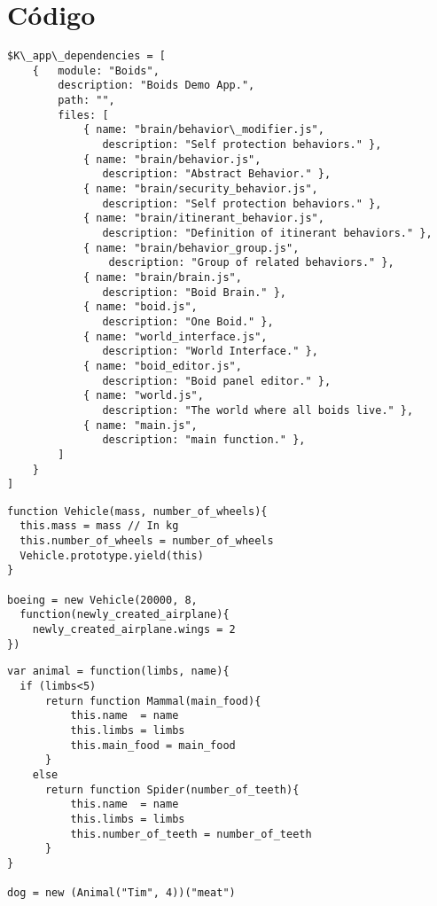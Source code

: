 \section{Código}
\label{sec:codigo}

\begin{lstlisting}[caption=Ejemplo de archivo dependencies]
$K\_app\_dependencies = [
    {   module: "Boids", 
        description: "Boids Demo App.",
        path: "",
        files: [
            { name: "brain/behavior\_modifier.js",  
               description: "Self protection behaviors." },
            { name: "brain/behavior.js",           
               description: "Abstract Behavior." },
            { name: "brain/security_behavior.js",  
               description: "Self protection behaviors." },
            { name: "brain/itinerant_behavior.js", 
               description: "Definition of itinerant behaviors." },
            { name: "brain/behavior_group.js",     
                description: "Group of related behaviors." },
            { name: "brain/brain.js",              
               description: "Boid Brain." },
            { name: "boid.js",                     
               description: "One Boid." },
            { name: "world_interface.js",          
               description: "World Interface." },
            { name: "boid_editor.js",              
               description: "Boid panel editor." },
            { name: "world.js",                    
               description: "The world where all boids live." },
            { name: "main.js",                     
               description: "main function." },
        ]
    }
]
\end{lstlisting}

\begin{lstlisting}[caption=Ejemplo clase]
 function Vehicle(mass, number_of_wheels){
  this.mass = mass // In kg 
  this.number_of_wheels = number_of_wheels
  Vehicle.prototype.yield(this)
}

boeing = new Vehicle(20000, 8, 
  function(newly_created_airplane){
    newly_created_airplane.wings = 2
})
\end{lstlisting}


\begin{lstlisting}[caption=Ejemplo clase con funciones]
 var animal = function(limbs, name){
  if (limbs<5)
      return function Mammal(main_food){
          this.name  = name
          this.limbs = limbs
          this.main_food = main_food
      }
    else
      return function Spider(number_of_teeth){
          this.name  = name
          this.limbs = limbs
          this.number_of_teeth = number_of_teeth
      }
}

dog = new (Animal("Tim", 4))("meat")

\end{lstlisting}

